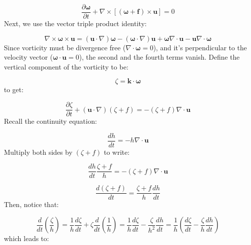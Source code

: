\documentclass[12pt]{article}
\numberwithin{equation}{section}
\numberwithin{figure}{section}
\numberwithin{table}{section}
\begin{document}
\begin{equation}
  \frac{\partial \boldsymbol{\omega}}{\partial t} +
  \nabla \times \left[(\boldsymbol{\omega} + \mathbf{f}) \times \mathbf{u}\right] = 0
\end{equation}
Next, we use the vector triple product identity:

\begin{equation}
  \nabla \times \boldsymbol{\omega} \times \mathbf{u} =
  (\mathbf{u} \cdot \nabla) \boldsymbol{\omega} -
  (\boldsymbol{\omega} \cdot \nabla) \mathbf{u} +
  \boldsymbol{\omega} \nabla \cdot \mathbf{u} -
  \mathbf{u} \nabla \cdot \boldsymbol{\omega}
\end{equation}
Since vorticity must be divergence free ($\nabla \cdot \boldsymbol{\omega} = 0$),
and it's perpendicular to the velocity vector ($\boldsymbol{\omega} \cdot \mathbf{u} = 0$),
the second and the fourth terms vanish.
Define the vertical component of the vorticity to be:

\begin{equation}
  \zeta = \mathbf{k} \cdot \boldsymbol{\omega}
\end{equation}
to get:

\begin{equation}
  \frac{\partial \zeta}{\partial t} +
  \left(\mathbf{u} \cdot \nabla \right) \left(\zeta + f\right) =
  - \left(\zeta + f\right) \nabla \cdot \mathbf{u}
\end{equation}
Recall the continuity equation:

\begin{equation}
  \frac{dh}{dt} = -h \nabla \cdot \mathbf{u}
\end{equation}
Multiply both sides by $(\zeta + f)$ to write:

\begin{equation}
  \frac{dh}{dt} \frac{\zeta + f}{h} = - \left(\zeta + f\right) \nabla \cdot \mathbf{u}
\end{equation}

\begin{equation}
  \frac{d(\zeta + f)}{dt} = \frac{\zeta + f}{h} \frac{dh}{dt}
\end{equation}
Then, notice that:

\begin{equation}
  \frac{d}{dt} \left( \frac{\zeta}{h} \right) =
  \frac{1}{h} \frac{d\zeta}{dt} +
  \zeta \frac{d}{dt} \left( \frac{1}{h} \right) =
  \frac{1}{h} \frac{d\zeta}{dt} -
  \frac{\zeta}{h^2} \frac{dh}{dt} =
  \frac{1}{h} \left( \frac{d\zeta}{dt} - \frac{\zeta}{h} \frac{dh}{dt} \right)
\end{equation}
which leads to:
\end{document}
